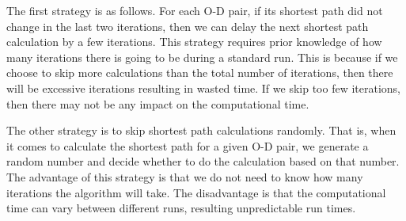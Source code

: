 The first strategy is as follows.
For each O-D pair,
if its shortest path did not change in the last two iterations,
then we can delay the next shortest path calculation by a few iterations.
This strategy requires prior knowledge of how many iterations there is going to be during a standard run.
This is because if we choose to skip more calculations than the total number of iterations,
then there will be excessive iterations resulting in wasted time.
If we skip too few iterations,
then there may not be any impact on the computational time.

The other strategy is to skip shortest path calculations randomly.
That is, when it comes to calculate the shortest path for a given O-D pair,
we generate a random number and decide whether to do the calculation based on that number.
The advantage of this strategy is that we do not need to know how many iterations the algorithm will take.
The disadvantage is that the computational time can vary between different runs,
resulting unpredictable run times.

\begin{comment}
    \section{Preprocessing and More}
    Preprocessing - trade memory to get faster time.
    We can either do a fast preprocessing between iterations to make query in each iteration (so combined speed is still faster) 
    or do a long preprocessing at the start and use the computed heuristic values
    \begin{itemize}
        \item A* landmarks and triangle inequality (ALT)
        \item Reach-based routing 
        \item ALT + Reach
        \item Geometric Containers
        \item Arc Flags
    \end{itemize}

    If we have more data on the network we can use
    algorithms that use hierarchies.
    Consider roads with higher speed first: use a hierarchy of subgraphs.
    \begin{itemize}
        \item Radius search.
        \item multi-level approach
        \item highway hierarchies
    \end{itemize}
\end{comment}


